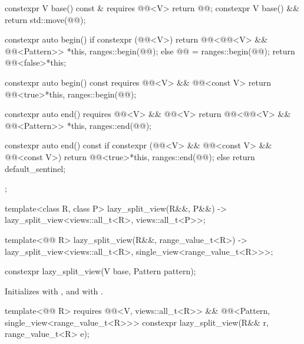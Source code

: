 \begin{codeblock}
{{    constexpr V base() const & requires @@<V> { return @@; }
    constexpr V base() && { return std::move(@@); }

    constexpr auto begin() {
      if constexpr (@@<V>) {
        return @@<@@<V> && @@<Pattern>>
          {*this, ranges::begin(@@)};
      } else {
        @@ = ranges::begin(@@);
        return @@<false>{*this};
      }
    }

    constexpr auto begin() const requires @@<V> && @@<const V> {
      return @@<true>{*this, ranges::begin(@@)};
    }

    constexpr auto end() requires @@<V> && @@<V> {
      return @@<@@<V> && @@<Pattern>>
        {*this, ranges::end(@@)};
    }

    constexpr auto end() const {
      if constexpr (@@<V> && @@<const V> && @@<const V>)
        return @@<true>{*this, ranges::end(@@)};
      else
        return default_sentinel;
    }
  };

  template<class R, class P>
    lazy_split_view(R&&, P&&) -> lazy_split_view<views::all_t<R>, views::all_t<P>>;

  template<@@ R>
    lazy_split_view(R&&, range_value_t<R>)
      -> lazy_split_view<views::all_t<R>, single_view<range_value_t<R>>>;
}
\end{codeblock}

%
\begin{itemdecl}
constexpr lazy_split_view(V base, Pattern pattern);
\end{itemdecl}

\begin{itemdescr}
\pnum
\effects
Initializes  with , and
 with .
\end{itemdescr}

%
\begin{itemdecl}
template<@@ R>
  requires @@<V, views::all_t<R>> &&
           @@<Pattern, single_view<range_value_t<R>>>
constexpr lazy_split_view(R&& r, range_value_t<R> e);
\end{itemdecl}

